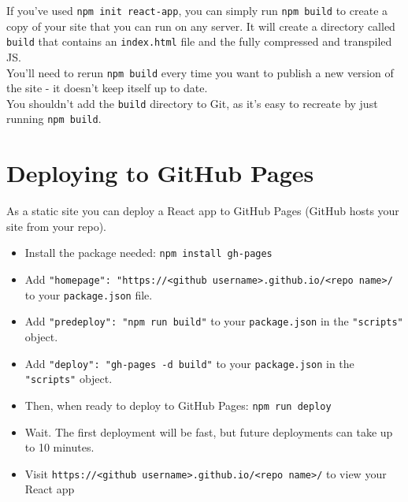 If you've used \texttt{npm init react-app}, you can simply run \texttt{npm build} to create a copy of your site that you can run on any server. It will create a directory called \texttt{build} that contains an \texttt{index.html} file and the fully compressed and transpiled JS.
\\

You'll need to rerun \texttt{npm build} every time you want to publish a new version of the site - it doesn't keep itself up to date.
\\

You shouldn't add the \texttt{build} directory to Git, as it's easy to recreate by just running \texttt{npm build}.


\section{Deploying to GitHub Pages}

As a static site you can deploy a React app to GitHub Pages (GitHub hosts your site from your repo).

\begin{itemize}
    \item Install the package needed: \texttt{npm install gh-pages}
    \item Add \texttt{"homepage": "https://<github username>.github.io/<repo name>/} to your \texttt{package.json} file.
    \item Add \texttt{"predeploy": "npm run build"} to your \texttt{package.json} in the \texttt{"scripts"} object.
    \item Add \texttt{"deploy": "gh-pages -d build"} to your \texttt{package.json} in the \texttt{"scripts"} object.
    \item Then, when ready to deploy to GitHub Pages: \texttt{npm run deploy}
    \item Wait. The first deployment will be fast, but future deployments can take up to 10 minutes.
    \item Visit \texttt{https://<github username>.github.io/<repo name>/} to view your React app
\end{itemize}
